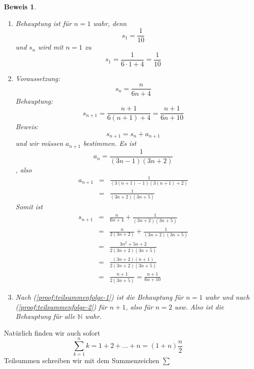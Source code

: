 \documentclass[a4paper,10pt]{report}
\newtheorem{myproof}{Beweis}
\begin{document}
\begin{myproof}\begin{enumerate}
\item \label{proof:teilsummenfolge-1} Behauptung ist für $n=1$ wahr, denn
\begin{equation*}s_1 = \frac{1}{10}\end{equation*}
und $s_n$ wird mit $n=1$ zu
\begin{equation*}s_1 = \frac{1}{6 \cdot 1 + 4} = \frac{1}{10}\end{equation*}
\item \label{proof:teilsummenfolge-2} Voraussetzung: 
\begin{equation*}s_n = \frac{n}{6n+4}\end{equation*}
Behauptung:
\begin{equation*}s_{n+1} = \frac{n+1}{6(n+1) + 4} = \frac{n+1}{6n+10}\end{equation*}
Beweis:
\begin{equation*}s_{n+1} = s_n + a_{n+1}\end{equation*}
und wir müssen $a_{n+1}$ bestimmen. Es ist
\begin{equation*}a_n = \frac{1}{(3n-1)(3n+2)}\end{equation*}
, also
\begin{eqnarray}a_{n+1} & = & \frac{1}{(3(n+1)-1)(3(n+1)+2)} \\
& = & \frac{1}{(3n+2)(3n+5)}\end{eqnarray}
Somit ist
\begin{eqnarray}s_{n+1} & = & \frac{n}{6n+4} + \frac{1}{(3n+2)(3n+5)} \\
& = & \frac{n}{2(3n+2)} + \frac{1}{(3n+2)(3n+5)} \\
& = & \frac{3n^2+5n+2}{2(3n+2)(3n+5)} \\
& = & \frac{(3n+2)(n+1)}{2(3n+2)(3n+5)} \\
& = & \frac{n+1}{2(3n+5)} = \frac{n+1}{6n+10}\end{eqnarray}
\item Nach (\ref{proof:teilsummenfolge-1}) ist die Behauptung für $n=1$ wahr und nach (\ref{proof:teilsummenfolge-2}) für $n+1$, also für $n=2$ usw. Also ist die Behauptung für alle $\mathbb{N}$ wahr.
\end{enumerate}\end{myproof}
Natürlich finden wir auch sofort
\begin{equation*}\sum_{k=1}^{n} k = 1 + 2 + ... + n = (1+n)\frac{n}{2}\end{equation*}
Teilsummen schreiben wir mit dem Summenzeichen $\sum$
\end{document}

